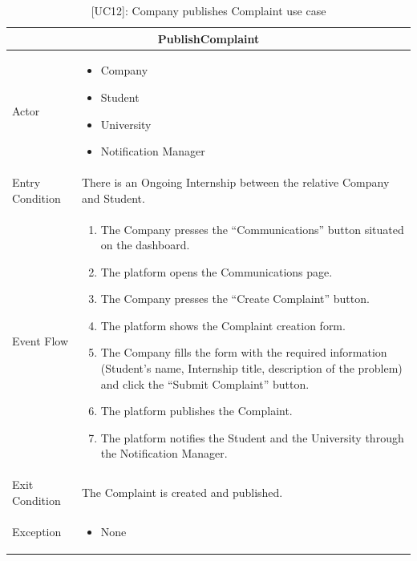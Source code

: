 \begin{table}[H]
    \centering
    \begin{tabular}{|p{3cm}|p{12cm}|}
    \hline
    \multicolumn{2}{|c|}{\textbf{PublishComplaint}} \\ \hline
    Actor & 
    \begin{itemize}
        \item Company
        \item Student
        \item University
        \item Notification Manager
    \end{itemize} \\ \hline
    Entry Condition & There is an Ongoing Internship between the relative Company and Student.\\ \hline
    Event Flow &      
    \begin{enumerate}         
        \item The Company presses the “Communications” button situated on the dashboard.
        \item The platform opens the Communications page.
        \item The Company presses the “Create Complaint” button.
        \item The platform shows the Complaint creation form.
        \item The Company fills the form with the required information (Student's name, Internship title, description of the problem) and click the “Submit Complaint” button.
        \item The platform publishes the Complaint.
        \item The platform notifies the Student and the University through the Notification Manager.
    \end{enumerate} \\ \hline
    Exit Condition & The Complaint is created and published. \\ \hline
    Exception & 
    \begin{itemize}       
        \item None
    \end{itemize} \\ \hline
    \end{tabular}
    \caption{[UC12]: Company publishes Complaint use case}
    \label{tab:UC12}
\end{table}

